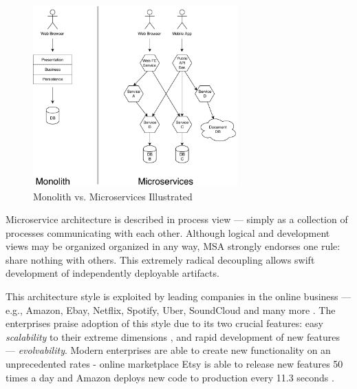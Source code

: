 \documentclass[thesis=M,english,hidelinks]{FITthesis}[2012/10/20]
\begin{document}
% 
% 
\begin{figure}[b]
  \centering
    \includegraphics[width=0.7\textwidth]{images/monolith_vs_microservice.pdf}
    \caption{Monolith vs. Microservices Illustrated}
    \label{fig:monolith_vs_microservices}
\end{figure}

Microservice architecture is described in process view --- simply as a collection of processes communicating with each other. Although logical and development views may be organized organized in any way, \acrshort{MSA} strongly endorses one rule: share nothing with others. This extremely radical decoupling allows swift development of independently deployable artifacts.

This architecture style is exploited by leading companies in the online business --- e.g., Amazon, Ebay, Netflix, Spotify, Uber, SoundCloud and many more \cite{ms-who-is-using}. The enterprises praise adoption of this style due to its two crucial features: easy \textit{scalability} to their extreme dimensions \cite{ms-ebay-scalability-best-practices, ms-ebay-ds-scalability, ms-spotify-horizontal-scaling, ms-spotify}, and rapid development of new features --- \textit{evolvability}. Modern enterprises are able to create new functionality on an unprecedented rates - online marketplace Etsy is able to release new features 50 times a day and Amazon deploys new code to production every 11.3 seconds \cite{devops-deploying-hourly}.

\end{document}
